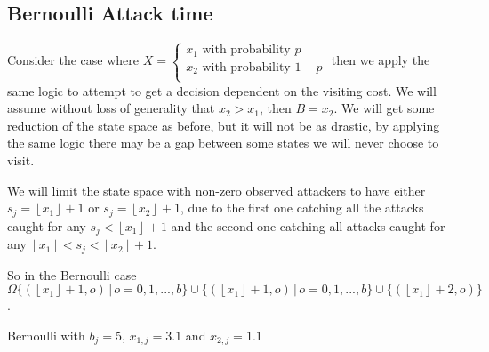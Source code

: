 \documentclass[a4paper,10pt]{article}
\newcommand{\floor}[1]{\left \lfloor #1 \right \rfloor}
\theoremstyle{definition}
\theoremstyle{definition}
\theoremstyle{remark}
\theoremstyle{definition}
\begin{document}
\subsection{Bernoulli Attack time}
Consider the case where $X=\begin{cases}
x_{1} \text{ with probability } p \\
x_{2} \text{ with probability } 1-p \\
\end{cases}$ then we apply the same logic to attempt to get a decision dependent on the visiting cost. We will assume without loss of generality that $x_{2} > x_{1}$, then $B=x_{2}$. We will get some reduction of the state space as before, but it will not be as drastic, by applying the same logic there may be a gap between some states we will never choose to visit.

We will limit the state space with non-zero observed attackers to have either $s_{j}=\floor{x_{1}}+1$ or $s_{j}=\floor{x_{2}}+1$, due to the first one catching all the attacks caught for any $s_{j}<\floor{x_{1}}+1$ and the second one catching all attacks caught for any $\floor{x_{1}}<s_{j}<\floor{x_{2}}+1$.

So in the Bernoulli case $\Omega \{(\floor{x_{1}}+1,o) \, | \, o=0,1,...,b \} \cup \{(\floor{x_{1}}+1,o) \, | \, o=0,1,...,b \} \cup \{(\floor{x_{1}}+2,o) \}$.

\begin{myfigure}
\begin{center}
\end{center}
\caption{Bernoulli with $b_{j}=5$, $x_{1,j}=3.1$ and $x_{2,j}=1.1$}
\end{myfigure}
\end{document}
